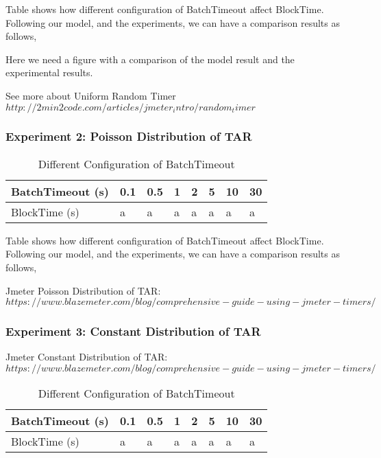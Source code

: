 \documentclass[10pt,journal,compsoc, twoside]{IEEEtran}
\begin{document}
Table shows how different configuration of BatchTimeout affect BlockTime. Following our model, and the experiments, we can have a comparison results as follows,

Here we need a figure with a comparison of the model result and the experimental results.


See more about Uniform Random Timer $http://2min2code.com/articles/jmeter_intro/random_timer$



\subsubsection{Experiment 2: Poisson Distribution of TAR}

\begin{table}[htbp]
	\caption{Different Configuration of BatchTimeout}
	\begin{tabular}{|l|l|l|l|l|l|l|l|}
		\hline
		BatchTimeout (s) & 0.1 & 0.5 & 1 & 2 & 5 & 10 & 30 \\ \hline
		BlockTime (s)    & a   & a   & a & a & a & a  & a  \\ \hline
	\end{tabular}
\end{table}

Table shows how different configuration of BatchTimeout affect BlockTime. Following our model, and the experiments, we can have a comparison results as follows,

Jmeter Poisson Distribution of TAR: $https://www.blazemeter.com/blog/comprehensive-guide-using-jmeter-timers/$




\subsubsection{Experiment 3: Constant Distribution of TAR}

Jmeter Constant Distribution of TAR: $https://www.blazemeter.com/blog/comprehensive-guide-using-jmeter-timers/$

\begin{table}[htbp]
	\caption{Different Configuration of BatchTimeout}
	\begin{tabular}{|l|l|l|l|l|l|l|l|}
		\hline
		BatchTimeout (s) & 0.1 & 0.5 & 1 & 2 & 5 & 10 & 30 \\ \hline
		BlockTime (s)    & a   & a   & a & a & a & a  & a  \\ \hline
	\end{tabular}
\end{table}
\end{document}
